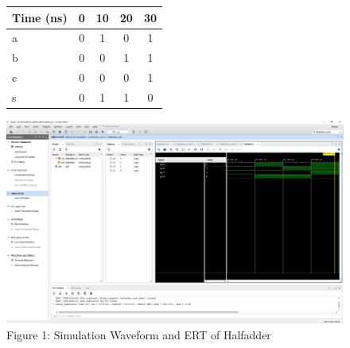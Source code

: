 \documentclass[11pt]{article}
\begin{document}
\begin{figure}[ht]\centering
	\begin{tabular}[ht]{l|cccc}
		Time (ns) & 0 & 10 & 20 & 30 \\
		\midrule
		a & 0 & 1 & 0 & 1\\
		b & 0 & 0 & 1 & 1\\
		\midrule
		c & 0 & 0 & 0 & 1\\
		s & 0 & 1 & 1 & 0\\
		\bottomrule
	\end{tabular}\medskip
	
	\includegraphics [width=1.0\textwidth,trim=640 600 10 135, clip]{halfadder_pic}
	\caption{Figure 1: Simulation Waveform and ERT of Halfadder}
	\label{fig:sim_with_table}
	
\end{figure}
\end{document}
